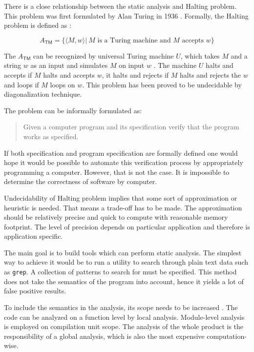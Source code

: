 \documentclass[12pt,final,oneside]{fithesis2}
\theoremstyle{definition}
\begin{document}
There is a close relationship between the static analysis and Halting
problem. This problem was first formulated by Alan Turing in 1936
\cite{Turing36-1}. Formally, the Halting problem is defined as
\cite{Sipser06-1}:

\begin{equation*}
A_{\mathsf{TM}} = \{ \langle M, w \rangle |
  \: M \text{ is a Turing machine and } M \text{ accepts } w \}
\end{equation*}

The $A_{\mathsf{TM}}$ can be recognized by universal Turing machine
$U$, which takes $M$ and a string $w$ as an input and simulates $M$ on input
$w$ \cite{Kozen97-1}. The machine $U$ halts and accepts if $M$ halts and
accepts $w$, it halts and rejects if $M$ halts and rejects the $w$ and loops
if $M$ loops on $w$. This problem has been proved to be undecidable by
diagonalization technique.

The problem can be informally formulated as:

\begin{quote}

Given a computer program and its specification verify that the program
works as specified.

\end{quote}

If both specification and program specification are formally defined one
would hope it would be possible to automate this verification process by
appropriately programming a computer. However, that is not the case.
It is impossible to determine the correctness of software by computer.

Undecidability of Halting problem implies that some sort of approximation
or heuristic is needed. That means a trade-off has to be made. The
approximation should be relatively precise and quick to compute with
reasonable memory footprint. The level of precision depends on particular
application and therefore is application specific.

The main goal is to build tools which can perform static analysis. The
simplest way to achieve it would be to run a utility to search through
plain text data such as \texttt{grep}. A collection of patterns to search
for must be specified. This method does not take the semantics of the
program into account, hence it yields a lot of false positive results.

To include the semantics in the analysis, its scope needs to be increased
\cite{Chess04-1}. The code can be analyzed on a function level by local
analysis. Module-level analysis is employed on compilation unit scope.
The analysis of the whole product is the responsibility of a global analysis,
which is also the most expensive computation-wise.
\end{document}
